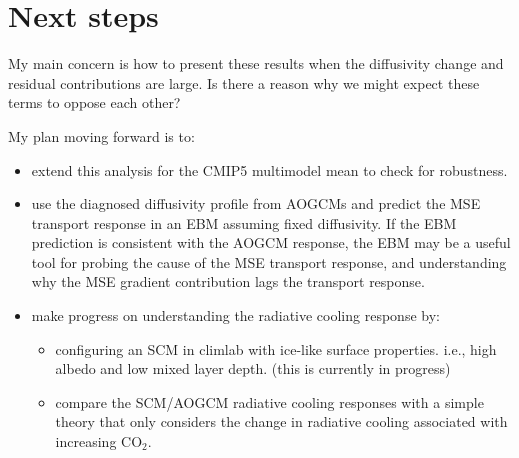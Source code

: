 \documentclass{article}
\begin{document}
\section*{Next steps}
My main concern is how to present these results when the diffusivity change and residual contributions are large. Is there a reason why we might expect these terms to oppose each other?

My plan moving forward is to:
\begin{itemize}
    \item extend this analysis for the CMIP5 multimodel mean to check for robustness.
    \item use the diagnosed diffusivity profile from AOGCMs and predict the MSE transport response in an EBM assuming fixed diffusivity. If the EBM prediction is consistent with the AOGCM response, the EBM may be a useful tool for probing the cause of the MSE transport response, and understanding why the MSE gradient contribution lags the transport response.
    \item make progress on understanding the radiative cooling response by:
        \begin{itemize}
            \item configuring an SCM in climlab with ice-like surface properties. i.e., high albedo and low mixed layer depth. (this is currently in progress)
            \item compare the SCM/AOGCM radiative cooling responses with a simple theory that only considers the change in radiative cooling associated with increasing CO$_2$.
        \end{itemize}
\end{itemize}



\end{document}
